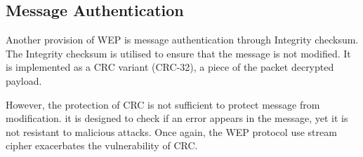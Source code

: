 \subsection{Message Authentication}
Another provision of \ac{WEP} is message authentication through Integrity checksum. The Integrity checksum is utilised to ensure that the message is not modified. It is implemented as a \ac{CRC} variant (\ac{CRC}-32), a piece of the packet decrypted payload.

However, the protection of \ac{CRC} is not sufficient to protect message from modification. it is designed to check if an error appears in the message, yet it is not resistant to malicious attacks. Once again, the \ac{WEP} protocol use stream cipher exacerbates the vulnerability of \ac{CRC}.


